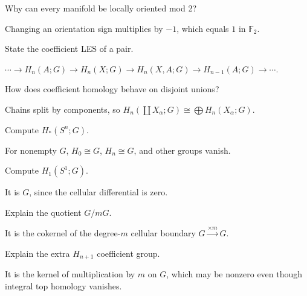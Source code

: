 \begin{problem}\label{prob:viii25-13}
Why can every manifold be locally oriented mod 2?
\end{problem}
\begin{solution}
Changing an orientation sign multiplies by \(-1\), which equals \(1\) in \(\mathbb F_2\).
\end{solution}

\begin{problem}\label{prob:viii25-14}
State the coefficient LES of a pair.
\end{problem}
\begin{solution}
\(\cdots\to H_n(A;G)\to H_n(X;G)\to H_n(X,A;G)\to H_{n-1}(A;G)\to\cdots\).
\end{solution}

\begin{problem}\label{prob:viii25-15}
How does coefficient homology behave on disjoint unions?
\end{problem}
\begin{solution}
Chains split by components, so \(H_n(\coprod X_\alpha;G)\cong\bigoplus H_n(X_\alpha;G)\).
\end{solution}

\begin{problem}\label{prob:viii25-16}
Compute \(H_*(S^n;G)\).
\end{problem}
\begin{solution}
For nonempty \(G\), \(H_0\cong G\), \(H_n\cong G\), and other groups vanish.
\end{solution}

\begin{problem}\label{prob:viii25-17}
Compute \(H_1(S^1;G)\).
\end{problem}
\begin{solution}
It is \(G\), since the cellular differential is zero.
\end{solution}

\begin{problem}[Moore G/mG]\label{prob:viii25-18}
Explain the quotient \(G/mG\).
\end{problem}
\begin{solution}
It is the cokernel of the degree-\(m\) cellular boundary \(G\xrightarrow{\times m}G\).
\end{solution}

\begin{problem}\label{prob:viii25-19}
Explain the extra \(H_{n+1}\) coefficient group.
\end{problem}
\begin{solution}
It is the kernel of multiplication by \(m\) on \(G\), which may be nonzero even though integral top homology vanishes.
\end{solution}

